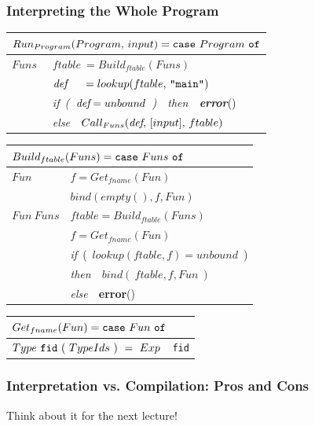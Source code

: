 \documentclass{beamer}
\begin{document}
\begin{frame}
\frametitle{Interpreting the Whole Program}

\begin{tabular}{|l|l|}\hline
\multicolumn{2}{|l|}{$Run_{Program}(Program,\,input)
 = \mbox{\tt case}~Program~\mbox{\tt of} $} \\\hline
$Funs$  & $ftable~= Build_{ftable}(Funs)$ \\
        & $\mbox{\em def~~~}~= lookup(ftable,\,\mbox{\tt "main"})$ \\
        & {\em if~(~$\mbox{\em def} = unbound$~)}~~{\em then~~\mbox{\bf error}}() \\
        & {\em else}~~$Call_{Funs}(\mbox{\em def},\,[input],\,ftable)$ \\\hline
\end{tabular}

\smallskip


\begin{tabular}{|l|l|}\hline
\multicolumn{2}{|l|}{$Build_{ftable}(Funs)
 = \mbox{\tt case}~Funs~\mbox{\tt of} $} \\\hline

$Fun$   & $f = Get_{fname}(Fun)$ \\ 
        & $bind(empty(),f,Fun)$ \\\hline

$Fun~Funs$
        & $ftable = Build_{ftable}(Funs)$ \\
        & $f = Get_{fname}(Fun)$ \\
        & {\em if}~(~$lookup(ftable,f) = unbound$~) \\
        & {\em then}~~$bind(~ftable,f,Fun~)$ \\
        & {\em else}~~{\bf error}() \\\hline
\end{tabular}

\smallskip

\begin{tabular}{|l|l|}\hline
\multicolumn{2}{|l|}{$Get_{fname}(Fun)
 = \mbox{\tt case}~Fun~\mbox{\tt of} $} \\\hline

$Type~{\tt fid}~(~TypeIds~)~=~Exp$
        & {\tt fid} \\\hline
\end{tabular}


\end{frame}


\begin{frame}
\frametitle{Interpretation vs. Compilation: Pros and Cons}

\alert{Think about it for the next lecture!}

\end{frame}
\end{document}
